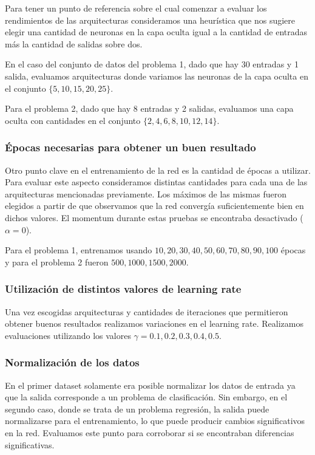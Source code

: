\documentclass[informe.tex]{subfiles}
\begin{document}
      Para tener un punto de referencia sobre el cual comenzar a evaluar los rendimientos de las arquitecturas consideramos una heurística que nos sugiere elegir una cantidad de neuronas en la capa oculta igual a la cantidad de entradas más la cantidad de salidas sobre dos\cite{nnwithJava}.
      
      En el caso del conjunto de datos del problema 1, dado que hay 30 entradas y 1 salida, evaluamos arquitecturas donde variamos las neuronas de la capa oculta en el conjunto $\{5,10,15,20,25\}$. 
      
      Para el problema 2, dado que hay 8 entradas y 2 salidas, evaluamos una capa oculta con cantidades en el conjunto $\{2,4,6,8,10,12,14\}$.
    
    
    \subsubsection{\'Epocas necesarias para obtener un buen resultado}
      Otro punto clave en el entrenamiento de la red es la cantidad de \'epocas a utilizar. Para evaluar este aspecto consideramos distintas cantidades para cada una de las arquitecturas mencionadas previamente. Los máximos de las mismas fueron elegidos a partir de que observamos que la red convergía suficientemente bien en dichos valores. El momentum durante estas pruebas se encontraba desactivado ($\alpha = 0$).
      
      Para el problema 1, entrenamos usando $10, 20, 30, 40, 50, 60, 70, 80, 90, 100$ \'epocas y para el problema 2 fueron $500, 1000, 1500, 2000$.
    
    
    \subsubsection{Utilizaci\'on de distintos valores de learning rate}
      Una vez escogidas arquitecturas y cantidades de iteraciones que permitieron obtener buenos resultados realizamos variaciones en el learning rate. Realizamos evaluaciones utilizando los valores $\gamma = 0.1, 0.2, 0.3, 0.4, 0.5 $.
    
    \subsubsection{Normalización de los datos}
      En el primer dataset solamente era posible normalizar los datos de entrada ya que la salida corresponde a un problema de clasificación. Sin embargo, en el segundo caso, donde se trata de un problema regresión, la salida puede normalizarse para el entrenamiento, lo que puede producir cambios significativos en la red. Evaluamos este punto para corroborar si se encontraban diferencias significativas.
      
\end{document}
